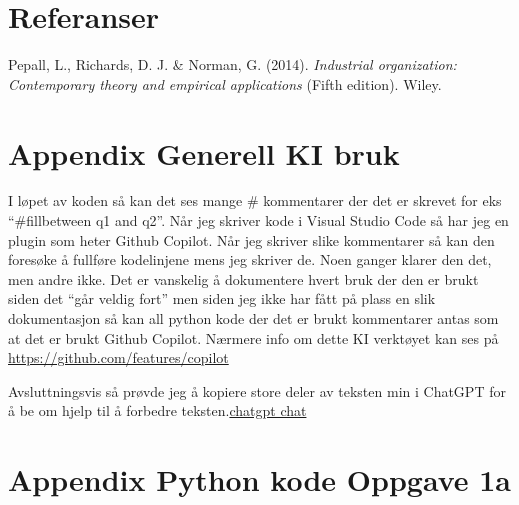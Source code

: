 \documentclass[
  12pt,
  a4paper,
  DIV=11,
  numbers=noendperiod]{scrartcl}
\newlength{\cslhangindent}
\newenvironment{CSLReferences}[2] %
 {\begin{list}{}{%
  \setlength{\itemindent}{0pt}
  \setlength{\leftmargin}{0pt}
  \setlength{\parsep}{0pt}
  \ifodd #1
   \setlength{\leftmargin}{\cslhangindent}
   \setlength{\itemindent}{-1\cslhangindent}
  \fi
  \setlength{\itemsep}{#2\baselineskip}}}
 {\end{list}}
\begin{document}
\clearpage

\section{Referanser}\label{referanser}

\label{refs}
\begin{CSLReferences}{1}{0}
Pepall, L., Richards, D. J. \& Norman, G. (2014). \emph{Industrial
organization: Contemporary theory and empirical applications} (Fifth
edition). Wiley.

\end{CSLReferences}

\clearpage

\appendix

\section {Appendix Generell KI bruk}

I løpet av koden så kan det ses mange \# kommentarer der det er skrevet
for eks ``\#fillbetween q1 and q2''. Når jeg skriver kode i Visual
Studio Code så har jeg en plugin som heter Github Copilot. Når jeg
skriver slike kommentarer så kan den foresøke å fullføre kodelinjene
mens jeg skriver de. Noen ganger klarer den det, men andre ikke. Det er
vanskelig å dokumentere hvert bruk der den er brukt siden det ``går
veldig fort'' men siden jeg ikke har fått på plass en slik dokumentasjon
så kan all python kode der det er brukt kommentarer antas som at det er
brukt Github Copilot. Nærmere info om dette KI verktøyet kan ses på
\url{https://github.com/features/copilot}

Avsluttningsvis så prøvde jeg å kopiere store deler av teksten min i
ChatGPT for å be om hjelp til å forbedre
teksten.\href{https://chat.openai.com/share/a72be4bd-cbbc-4e7c-82d5-dc9c5241b74b}{chatgpt
chat}

\clearpage

\section {Appendix Python kode Oppgave 1a}
\end{document}
